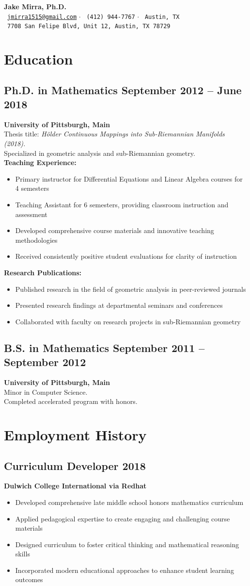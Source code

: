 \documentclass[11pt]{article}
\makeatletter
\newcommand{\cventry}[3]{
  \subsection[#1]{#1 \hfill #2}
  #3
}
\newcommand{\cvheader}{
  \begin{center}
    {\Huge\bfseries Jake Mirra, Ph.D.}\\[0.5em]
    \faEnvelope\ \href{mailto:jmirra1515@gmail.com}{\texttt{jmirra1515@gmail.com}} $\cdot$
    \faPhone\ \texttt{(412) 944-7767} $\cdot$
    \faMapMarker\ \texttt{Austin, TX}\\
    \faHome\ \texttt{7708 San Felipe Blvd, Unit 12, Austin, TX 78729}
  \end{center}
}
\makeatother
\begin{document}
\cvheader

\section{Education}
\cventry{Ph.D. in Mathematics}{September 2012 -- June 2018}{
  \textbf{University of Pittsburgh, Main}\\
  Thesis title: \emph{Hölder Continuous Mappings into Sub-Riemannian Manifolds (2018).}\\
  Specialized in geometric analysis and sub-Riemannian geometry.\\
  \textbf{Teaching Experience:}
  \begin{itemize}[leftmargin=*]
    \item Primary instructor for Differential Equations and Linear Algebra courses for 4 semesters
    \item Teaching Assistant for 6 semesters, providing classroom instruction and assessment
    \item Developed comprehensive course materials and innovative teaching methodologies
    \item Received consistently positive student evaluations for clarity of instruction
  \end{itemize}
  \textbf{Research Publications:}
  \begin{itemize}[leftmargin=*]
    \item Published research in the field of geometric analysis in peer-reviewed journals
    \item Presented research findings at departmental seminars and conferences
    \item Collaborated with faculty on research projects in sub-Riemannian geometry
  \end{itemize}
}

\cventry{B.S. in Mathematics}{September 2011 -- September 2012}{
  \textbf{University of Pittsburgh, Main}\\
  Minor in Computer Science.\\
  Completed accelerated program with honors.
}

\section{Employment History}
\cventry{Curriculum Developer}{2018}{
  \textbf{Dulwich College International via Redhat}
  \begin{itemize}[leftmargin=*]
    \item Developed comprehensive late middle school honors mathematics curriculum
    \item Applied pedagogical expertise to create engaging and challenging course materials
    \item Designed curriculum to foster critical thinking and mathematical reasoning skills
    \item Incorporated modern educational approaches to enhance student learning outcomes
  \end{itemize}
}
\end{document}
